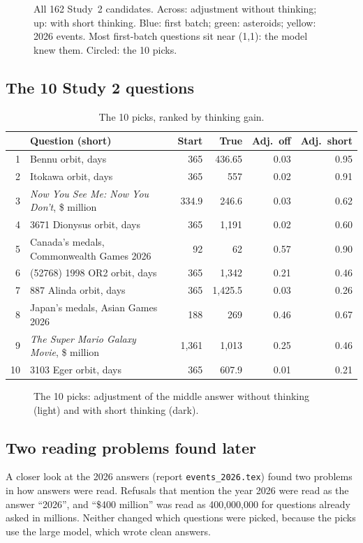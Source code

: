 \documentclass[11pt,a4paper]{article}
\begin{document}
\begin{figure}[ht]
\centering{}
\caption{All 162 Study~2 candidates. Across: adjustment without thinking; up: with short thinking. Blue: first batch; green: asteroids; yellow: 2026 events. Most first-batch questions sit near (1,1): the model knew them. Circled: the 10 picks.}
\end{figure}

\subsection{The 10 Study 2 questions}
\begin{table}[ht]
\centering\small
\begin{tabular}{@{}rlrrrr@{}}
\toprule
& Question (short) & Start & True & Adj.\ off & Adj.\ short \\
\midrule
1 & Bennu orbit, days & 365 & 436.65 & 0.03 & 0.95 \\
2 & Itokawa orbit, days & 365 & 557 & 0.02 & 0.91 \\
3 & \emph{Now You See Me: Now You Don't}, \$ million & 334.9 & 246.6 & 0.03 & 0.62 \\
4 & 3671 Dionysus orbit, days & 365 & 1,191 & 0.02 & 0.60 \\
5 & Canada's medals, Commonwealth Games 2026 & 92 & 62 & 0.57 & 0.90 \\
6 & (52768) 1998 OR2 orbit, days & 365 & 1,342 & 0.21 & 0.46 \\
7 & 887 Alinda orbit, days & 365 & 1,425.5 & 0.03 & 0.26 \\
8 & Japan's medals, Asian Games 2026 & 188 & 269 & 0.46 & 0.67 \\
9 & \emph{The Super Mario Galaxy Movie}, \$ million & 1,361 & 1,013 & 0.25 & 0.46 \\
10 & 3103 Eger orbit, days & 365 & 607.9 & 0.01 & 0.21 \\
\bottomrule
\end{tabular}
\caption{The 10 picks, ranked by thinking gain.}
\end{table}

\begin{figure}[ht]
\centering{}
\caption{The 10 picks: adjustment of the middle answer without thinking (light) and with short thinking (dark).}
\end{figure}

\FloatBarrier
\subsection{Two reading problems found later}
A closer look at the 2026 answers (report \texttt{events\_2026.tex}) found two problems in how answers were read. Refusals that mention the year 2026 were read as the answer \enquote{2026}, and \enquote{\$400 million} was read as 400,000,000 for questions already asked in millions. Neither changed which questions were picked, because the picks use the large model, which wrote clean answers.
\end{document}
